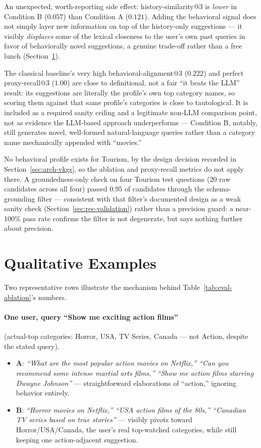 An unexpected, worth-reporting side effect: history-similarity@3 is \emph{lower} in Condition B
($0.057$) than Condition A ($0.121$). Adding the behavioral signal does not simply layer new
information on top of the history-only suggestions --- it visibly \emph{displaces} some of the
lexical closeness to the user's own past queries in favor of behaviorally novel suggestions, a
genuine trade-off rather than a free lunch (Section~\ref{sec:eval-qual}).

The classical baseline's very high behavioral-alignment@3 ($0.222$) and perfect proxy-recall@3
($1.00$) are close to definitional, not a fair ``it beats the LLM'' result: its suggestions are
literally the profile's own top category names, so scoring them against that same profile's
categories is close to tautological. It is included as a required sanity ceiling and a legitimate
non-LLM comparison point, not as evidence the LLM-based approach underperforms --- Condition B,
notably, still generates novel, well-formed natural-language queries rather than a category name
mechanically appended with ``movies.''

No behavioral profile exists for Tourism, by the design decision recorded in
Section~\ref{sec:arch-vkgs}, so the ablation and proxy-recall metrics do not apply there. A
groundedness-only check on four Tourism test questions (20 raw candidates across all four) passed
$0.95$ of candidates through the schema-grounding filter --- consistent with that filter's
documented design as a weak sanity check (Section~\ref{sec:rec-validation}) rather than a precision
guard: a near-100\% pass rate confirms the filter is not degenerate, but says nothing further about
precision.

\section{Qualitative Examples}
\label{sec:eval-qual}

Two representative rows illustrate the mechanism behind Table~\ref{tab:eval-ablation}'s numbers.

\paragraph{One user, query ``Show me exciting action films''} (actual-top categories: Horror, USA,
TV Series, Canada --- not Action, despite the stated query).
\begin{itemize}
    \item \textbf{A}: \emph{``What are the most popular action movies on Netflix,'' ``Can you
        recommend some intense martial arts films,'' ``Show me action films starring Dwayne
        Johnson''} --- straightforward elaborations of ``action,'' ignoring behavior entirely.
    \item \textbf{B}: \emph{``Horror movies on Netflix,'' ``USA action films of the 80s,''
        ``Canadian TV series based on true stories''} --- visibly pivots toward Horror/USA/Canada,
        the user's real top-watched categories, while still keeping one action-adjacent suggestion.
\end{itemize}

